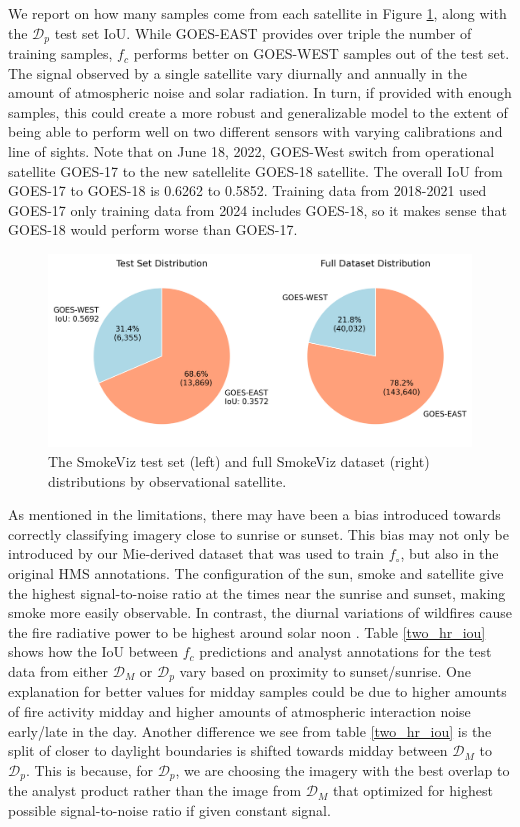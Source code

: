 \documentclass{article}
\begin{document}
We report on how many samples come from each satellite in Figure \ref{sat_dataset}, along with the \(\mathcal{D}_p\) test set IoU. While GOES-EAST provides over triple the number of training samples, \(f_c\) performs better on GOES-WEST samples out of the test set. The signal observed by a single satellite vary diurnally and annually in the amount of atmospheric noise and solar radiation. In turn, if provided with enough samples, this could create a more robust and generalizable model to the extent of being able to perform well on two different sensors with varying calibrations and line of sights. Note that on June 18, 2022, GOES-West switch from operational satellite GOES-17 to the new satellelite GOES-18 satellite. The overall IoU from GOES-17 to GOES-18 is 0.6262 to 0.5852. Training data from 2018-2021 used GOES-17 only training data from 2024 includes GOES-18, so it makes sense that GOES-18 would perform worse than GOES-17. 

\begin{figure}[!htb]
    \centering
    \includegraphics[width=\linewidth]{stat_figs/satellite_test_full_dataset.png}
    \caption{The SmokeViz test set (left) and full SmokeViz dataset (right) distributions by observational satellite.}
    \label{sat_dataset}
\end{figure}

As mentioned in the limitations, there may have been a bias introduced towards correctly classifying imagery close to sunrise or sunset. This bias may not only be introduced by our Mie-derived dataset that was used to train \(f_{\circ}\), but also in the original HMS annotations. The configuration of the sun, smoke and satellite give the highest signal-to-noise ratio at the times near the sunrise and sunset, making smoke more easily observable. In contrast, the diurnal variations of wildfires cause the fire radiative power to be highest around solar noon \cite{diurnal}. Table \ref{two_hr_iou} shows how the IoU between \(f_c\) predictions and analyst annotations for the test data from either \(\mathcal{D}_M\) or \(\mathcal{D}_p\) vary based on proximity to sunset/sunrise. One explanation for better values for midday samples could be due to higher amounts of fire activity midday and higher amounts of atmospheric interaction noise early/late in the day. Another difference we see from table \ref{two_hr_iou} is the split of closer to daylight boundaries is shifted towards midday between \(\mathcal{D}_M\) to \(\mathcal{D}_p\). This is because, for \(\mathcal{D}_p\), we are choosing the imagery with the best overlap to the analyst product rather than the image from \(\mathcal{D}_M\) that optimized for highest possible signal-to-noise ratio if given constant signal.
\end{document}
